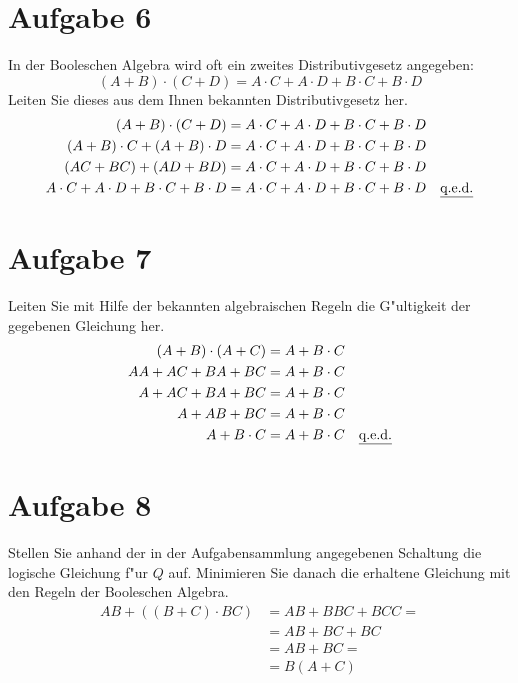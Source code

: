 \documentclass[10pt, oneside]{article}
\begin{document}
\pagebreak
\section{Aufgabe 6}

In der Booleschen Algebra wird oft ein zweites Distributivgesetz angegeben:
\begin{equation*}
    (A + B) \cdot (C + D) = A \cdot C + A \cdot D + B \cdot C + B \cdot D
\end{equation*}
Leiten Sie dieses aus dem Ihnen bekannten Distributivgesetz her.
\begin{align*}
    (A + B) \cdot (C + D)                         &= A \cdot C + A \cdot D + B \cdot C + B \cdot D \\
    (A + B) \cdot C + (A + B) \cdot D             &= A \cdot C + A \cdot D + B \cdot C + B \cdot D \\
    (AC + BC) + (AD + BD)                         &= A \cdot C + A \cdot D + B \cdot C + B \cdot D \\
    A \cdot C + A \cdot D + B \cdot C + B \cdot D &= A \cdot C + A \cdot D + B \cdot C + B \cdot D \quad \text{\underline{q.e.d.}}
\end{align*}

\section{Aufgabe 7}

Leiten Sie mit Hilfe der bekannten algebraischen Regeln die G"ultigkeit der
gegebenen Gleichung her.
\begin{align*}
    (A + B) \cdot (A + C) &= A + B \cdot C \\
    AA + AC + BA + BC &= A + B \cdot C \\
    A + AC + BA + BC &= A + B \cdot C \\
    A + AB + BC &= A + B \cdot C \\
    A + B \cdot C &= A + B \cdot C \quad \text{\underline{q.e.d.}}
\end{align*}

\section{Aufgabe 8}

Stellen Sie anhand der in der Aufgabensammlung angegebenen Schaltung die
logische Gleichung f"ur $Q$ auf. Minimieren Sie danach die erhaltene Gleichung
mit den Regeln der Booleschen Algebra.
\begin{align*}
    AB + ((B + C) \cdot BC) &= AB + BBC + BCC = \\
                            &= AB + BC + BC \\
                            &= AB + BC = \\
                            &= B(A + C)
\end{align*}
\end{document}
